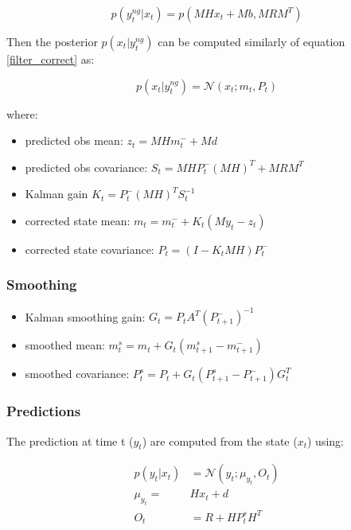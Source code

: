 \documentclass{article}
\newcommand{\norm}[3]{\mathcal{N}\left(#1; #2, #3\right)} %
\let\Oldsubsubsection\subsubsection
\renewcommand{\subsubsection}{\FloatBarrier\Oldsubsubsection}
\begin{document}
\begin{equation}\label{filter_correct_obs_missing}
    p(y^{ng}_t|x_t) = p(MHx_t + Mb, MRM^T) 
\end{equation}

Then the posterior $p(x_t|y_t^{ng})$ can be computed similarly of equation \ref{filter_correct} as:

\begin{equation}\label{filter_correct_missing}
 p(x_t|y^{ng}_t) = \mathcal{N}(x_t; m_t, P_t)   
\end{equation}
    
where:

\begin{itemize}
    \item predicted obs mean: $z_t = MHm_t^- + Md$   
    \item predicted obs covariance: $S_t = MHP_t^-(MH)^T + MRM^T$
    \item Kalman gain $K_t = P_t^-(MH)^TS_t^{-1}$ 
    \item corrected state mean: $m_t = m_t^- + K_t(My_t - z_t)$ 
    \item corrected state covariance: $P_t = (I-K_tMH)P_t^-$ 
\end{itemize}

\subsubsection{Smoothing}

\begin{itemize}
    \item Kalman smoothing gain: $G_t = P_tA^T(P_{t+1}^-)^{-1}$
    \item smoothed mean: $m_t^s = m_t + G_t(m_{t+1}^s - m_{t+1}^-)$
    \item smoothed covariance: $P_t^s = P_t + G_t(P_{t+1}^s - P_{t+1}^-)G_t^T$
\end{itemize}

\subsubsection{Predictions}

The prediction at time t ($y_t$) are computed from the state ($x_t$) using:

\begin{align}\label{filter_predictions}
    p(y_t|x_t) &= \norm{y_t}{\mu_{y_t}}{O_t} \\
    \mu_{y_t} =& Hx_t + d \\
    O_t &= R + HP^s_tH^T
\end{align}
\end{document}
